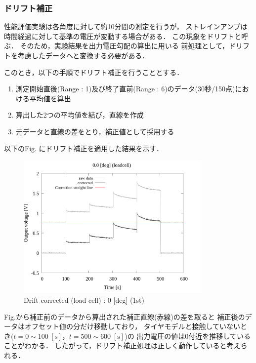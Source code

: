 \newpage

\subsubsection{ドリフト補正}
性能評価実験は各角度に対して約10分間の測定を行うが，
ストレインアンプは時間経過に対して基準の電圧が変動する場合がある．
この現象をドリフトと呼ぶ．
そのため，実験結果を出力電圧勾配の算出に用いる
前処理として，ドリフトを考慮したデータへと変換する必要がある．

このとき，以下の手順でドリフト補正を行うこととする．

\begin{enumerate}[(1)]
	\item 測定開始直後(Range : 1)及び終了直前(Range : 6)のデータ(30秒/150点)における平均値を算出
	\item 算出した2つの平均値を結び，直線を作成
	\item 元データと直線の差をとり，補正値として採用する
\end{enumerate}

以下のFig. にドリフト補正を適用した結果を示す．

\begin{figure}[htbp]
	\footnotesize
	\begin{center}
		\includegraphics[width=95mm]{../../02_workspace/result/2-1/plot/02-1_loadcell/02_loadcell-drift_0.png}
		\caption{Drift corrected (load cell) : 0 [deg] (1st)}
	\end{center}
\end{figure}

Fig.から補正前のデータから算出された補正直線(赤線)の差を取ると
補正後のデータはオフセット値の分だけ移動しており，
タイヤモデルと接触していないとき($t = 0 \sim 100 \; [\mathrm{s}]$，$t = 500 \sim 600 \; [\mathrm{s}]$)の
出力電圧の値は0付近を推移していることがわかる．
したがって，ドリフト補正処理は正しく動作していると考えられる．

